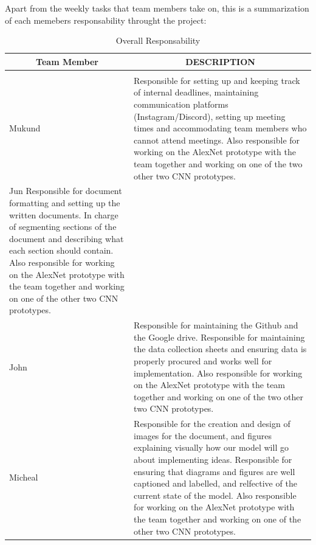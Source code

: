 \documentclass{article} %
\begin{document}
Apart from the weekly tasks that team members take on, this is a summarization of each memebers responsability throught the project:
\begin{table}[t]
\caption{Overall Responsability}
\label{sample-table}
\begin{center}
\begin{tabular}{ll}
\multicolumn{1}{c}{\bf Team Member}  &\multicolumn{1}{c}{\bf DESCRIPTION}
\\ \hline \\
Mukund           &Responsible for setting up and keeping track of internal deadlines, maintaining communication platforms (Instagram/Discord), setting up meeting times
                 and accommodating team members who cannot attend meetings. Also responsible for working on the AlexNet prototype with the team together and working on                  one of the two other two CNN prototypes.\\
                 
Jun              Responsible for document formatting and setting up the written documents. In charge of segmenting sections of the document and describing what each                    section should contain. Also responsible for working on the AlexNet prototype with the team together and working on one of the other two CNN                            prototypes. \\

John             &Responsible for maintaining the Github and the Google drive. Responsible for maintaining the data collection sheets and ensuring data is properly                      procured and works well for implementation. Also responsible for working on the AlexNet prototype with the team together and working on one of the two                  other two CNN prototypes.\\

Micheal          &Responsible for the creation and design of images for the document, and figures explaining visually how our model will go about implementing ideas.                    Responsible for ensuring that diagrams and figures are well captioned and labelled, and relfective of the current state of the model. Also responsible                  for working on the AlexNet prototype with the team together and working on one of the other two CNN prototypes. \\

\end{tabular}
\end{center}
\end{table}
\end{document}
